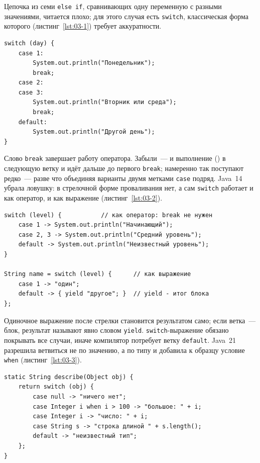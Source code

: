 Цепочка из семи \texttt{else if}, сравнивающих одну переменную с разными
значениями, читается плохо; для этого случая есть \texttt{switch}, классическая
форма которого (листинг~\ref{lst:03-1}) требует аккуратности.

\begin{listing}[H]
\begin{verbatim}
switch (day) {
    case 1:
        System.out.println("Понедельник");
        break;
    case 2:
    case 3:
        System.out.println("Вторник или среда");
        break;
    default:
        System.out.println("Другой день");
}
\end{verbatim}
\caption{Классический switch и проваливание}
\label{lst:03-1}
\end{listing}

Слово \texttt{break} завершает работу оператора. Забыли~--- и выполнение
 () в следующую ветку и идёт дальше до
первого \texttt{break}; намеренно так поступают редко~--- разве что объединяя
варианты двумя метками \texttt{case} подряд. Java~14 убрала ловушку: в
стрелочной форме проваливания нет, а сам \texttt{switch} работает и как
оператор, и как выражение (листинг~\ref{lst:03-2}).

\begin{listing}[H]
\begin{verbatim}
switch (level) {           // как оператор: break не нужен
    case 1 -> System.out.println("Начинающий");
    case 2, 3 -> System.out.println("Средний уровень");
    default -> System.out.println("Неизвестный уровень");
}

String name = switch (level) {      // как выражение
    case 1 -> "один";
    default -> { yield "другое"; }  // yield - итог блока
};
\end{verbatim}
\caption{Стрелочный switch: оператор и выражение}
\label{lst:03-2}
\end{listing}

Одиночное выражение после стрелки становится результатом само; если ветка~---
блок, результат называют явно словом \texttt{yield}.
\texttt{switch}-выражение обязано покрывать все случаи, иначе компилятор
потребует ветку \texttt{default}. Java~21 разрешила ветвиться не по значению, а
по типу и добавила к образцу условие \texttt{when} (листинг~\ref{lst:03-3}).

\begin{listing}[H]
\begin{verbatim}
static String describe(Object obj) {
    return switch (obj) {
        case null -> "ничего нет";
        case Integer i when i > 100 -> "большое: " + i;
        case Integer i -> "число: " + i;
        case String s -> "строка длиной " + s.length();
        default -> "неизвестный тип";
    };
}
\end{verbatim}
\caption{switch с сопоставлением по образцу}
\label{lst:03-3}
\end{listing}

